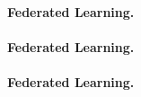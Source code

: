 \documentclass[twoside,11pt]{article}
\begin{document}
\vspace{0.08in}
\paragraph{Federated Learning.} \lipsum[35]

\vspace{0.08in}
\paragraph{Federated Learning.} \lipsum[35]

\vspace{0.08in}
\paragraph{Federated Learning.} \lipsum[35]



\newpage

\textbf{\scalebox{1.3}{References}}
\vspace{-0.3in}

\end{document}
